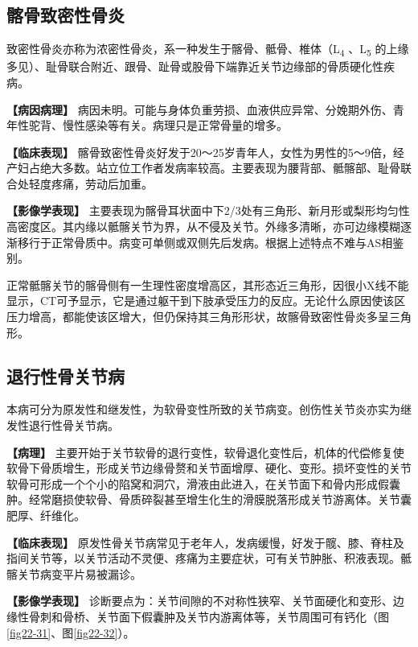 \subsection{髂骨致密性骨炎}

致密性骨炎亦称为浓密性骨炎，系一种发生于髂骨、骶骨、椎体（L\textsubscript{4}
、L\textsubscript{5}
的上缘多见）、耻骨联合附近、跟骨、趾骨或股骨下端靠近关节边缘部的骨质硬化性疾病。

\textbf{【病因病理】}
病因未明。可能与身体负重劳损、血液供应异常、分娩期外伤、青年性驼背、慢性感染等有关。病理只是正常骨量的增多。

\textbf{【临床表现】}
髂骨致密性骨炎好发于20～25岁青年人，女性为男性的5～9倍，经产妇占绝大多数。站立位工作者发病率较高。主要表现为腰背部、骶髂部、耻骨联合处轻度疼痛，劳动后加重。

\textbf{【影像学表现】}
主要表现为髂骨耳状面中下2/3处有三角形、新月形或梨形均匀性高密度区。其内缘以骶髂关节为界，从不侵及关节。外缘多清晰，亦可边缘模糊逐渐移行于正常骨质中。病变可单侧或双侧先后发病。根据上述特点不难与AS相鉴别。

正常骶髂关节的髂骨侧有一生理性密度增高区，其形态近三角形，因很小X线不能显示，CT可予显示，它是通过躯干到下肢承受压力的反应。无论什么原因使该区压力增高，都能使该区增大，但仍保持其三角形形状，故髂骨致密性骨炎多呈三角形。

\subsection{退行性骨关节病}

本病可分为原发性和继发性，为软骨变性所致的关节病变。创伤性关节炎亦实为继发性退行性骨关节病。

\textbf{【病理】}
主要开始于关节软骨的退行变性，软骨退化变性后，机体的代偿修复使软骨下骨质增生，形成关节边缘骨赘和关节面增厚、硬化、变形。损坏变性的关节软骨可形成一个个小的陷窝和洞穴，滑液由此进入，在关节面下和骨内形成假囊肿。经常磨损使软骨、骨质碎裂甚至增生化生的滑膜脱落形成关节游离体。关节囊肥厚、纤维化。

\textbf{【临床表现】}
原发性骨关节病常见于老年人，发病缓慢，好发于髋、膝、脊柱及指间关节等，以关节活动不灵便、疼痛为主要症状，可有关节肿胀、积液表现。骶髂关节病变平片易被漏诊。

\textbf{【影像学表现】}
诊断要点为：关节间隙的不对称性狭窄、关节面硬化和变形、边缘性骨刺和骨桥、关节面下假囊肿及关节内游离体等，关节周围可有钙化（图\ref{fig22-31}、图\ref{fig22-32}）。

